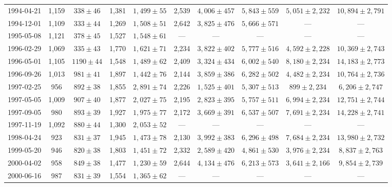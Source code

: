 \begin{landscape}
\begin{longtable}{cccccccccc}
{1994-04-21} & 1,159 & {$338  \pm  46$} & 1,381 & {$1,499 \pm 55$} & 2,539 & {$4,006 \pm 457$} & {$5,843 \pm 559$} & {$5,051 \pm 2,232$} & {$10,894 \pm 2,791$} \\
{1994-12-01} & 1,109 & {$333  \pm  44$} & 1,269 & {$1,508 \pm 51$} & 2,642 & {$3,825 \pm 476$} & {$5,666 \pm 571$} & --- & --- \\
{1995-05-08} & 1,121 & {$378  \pm  45$} & 1,527 & {$1,548 \pm 61$} & --- & --- & --- & --- & --- \\
{1996-02-29} & 1,069 & {$335  \pm  43$} & 1,770 & {$1,621 \pm 71$} & 2,234 & {$3,822 \pm 402$} & {$5,777 \pm 516$} & {$4,592 \pm 2,228$} & {$10,369 \pm 2,743$} \\
{1996-05-01} & 1,105 & {$1190  \pm  44$} & 1,548 & {$1,489 \pm 62$} & 2,409 & {$3,324 \pm 434$} & {$6,002 \pm 540$} & {$8,180 \pm 2,234$} & {$14,183 \pm 2,773$} \\
{1996-09-26} & 1,013 & {$981  \pm  41$} & 1,897 & {$1,442 \pm 76$} & 2,144 & {$3,859 \pm 386$} & {$6,282 \pm 502$} & {$4,482 \pm 2,234$} & {$10,764 \pm 2,736$} \\
{1997-02-25} & 956 & {$892  \pm  38$} & 1,855 & {$2,891 \pm 74$} & 2,226 & {$1,525 \pm 401$} & {$5,307 \pm 513$} & {$899 \pm 2,234$} & {$6,206 \pm 2,747$} \\
{1997-05-05} & 1,009 & {$907  \pm  40$} & 1,877 & {$2,027 \pm 75$} & 2,195 & {$2,823 \pm 395$} & {$5,757 \pm 511$} & {$6,994 \pm 2,234$} & {$12,751 \pm 2,744$} \\
{1997-09-05} & 980 & {$893  \pm  39$} & 1,927 & {$1,975 \pm 77$} & 2,172 & {$3,669 \pm 391$} & {$6,537 \pm 507$} & {$7,691 \pm 2,234$} & {$14,228 \pm 2,741$} \\
{1997-11-19} & 1,092 & {$880  \pm  44$} & 1,300 & {$2,053 \pm 52$} & --- & --- & --- & --- & --- \\
{1998-04-24} & 923 & {$831  \pm  37$} & 1,945 & {$1,473 \pm 78$} & 2,130 & {$3,992 \pm 383$} & {$6,296 \pm 498$} & {$7,684 \pm 2,234$} & {$13,980 \pm 2,732$} \\
{1999-05-20} & 946 & {$820  \pm  38$} & 1,803 & {$1,451 \pm 72$} & 2,332 & {$2,589 \pm 420$} & {$4,861 \pm 530$} & {$3,976 \pm 2,234$} & {$8,837 \pm 2,763$} \\
{2000-04-02} & 958 & {$849  \pm  38$} & 1,477 & {$1,230 \pm 59$} & 2,644 & {$4,134 \pm 476$} & {$6,213 \pm 573$} & {$3,641 \pm 2,166$} & {$9,854 \pm 2,739$} \\
{2000-06-16} & 987 & {$831  \pm  39$} & 1,554 & {$1,365 \pm 62$} & --- & --- & --- & --- & --- \\

\end{longtable}
\end{landscape}
